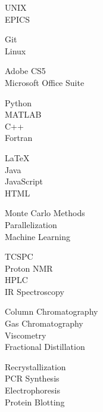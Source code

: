 \begin{minipage}[t]{0.2\textwidth}
	\flushleft
\end{minipage}
\begin{minipage}[t]{0.8\textwidth}
	{
		\begin{minipage}[t]{0.30\textwidth}
			UNIX\\
			EPICS
		\end{minipage}
		\begin{minipage}[t]{0.30\textwidth}
			Git\\
			Linux
		\end{minipage}
		\begin{minipage}[t]{0.30\textwidth}
			Adobe CS5\\
			Microsoft Office Suite
		\end{minipage}
	}
	
	\vspace*{4pt}
	{
		\begin{minipage}[t]{0.30\textwidth}
			Python\\
			MATLAB\\
			C++\\
			Fortran
		\end{minipage}
		\begin{minipage}[t]{0.30\textwidth}
			\LaTeX\\
			Java\\
			JavaScript\\
			HTML
		\end{minipage}
		\begin{minipage}[t]{0.30\textwidth}
			Monte Carlo Methods\\
			Parallelization\\
			Machine Learning
		\end{minipage}
	}
	
	\vspace*{4pt}
	{
		\begin{minipage}[t]{0.30\textwidth}
			TCSPC\\
			Proton NMR\\
			HPLC\\
			IR Spectroscopy
		\end{minipage}
		\begin{minipage}[t]{0.30\textwidth}
			Column Chromatography\\
			Gas Chromatography\\
			Viscometry\\
			Fractional Distillation
		\end{minipage}
		\begin{minipage}[t]{0.30\textwidth}
			Recrystallization\\
			PCR Synthesis\\
			Electrophoresis\\
			Protein Blotting
		\end{minipage}
	}
	

\end{minipage}
